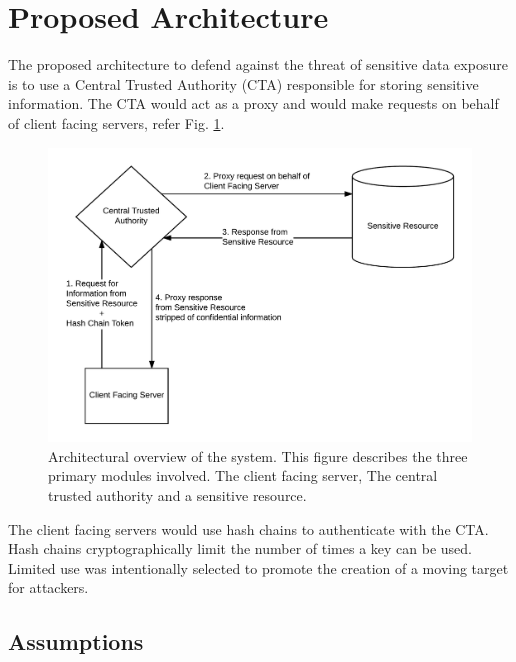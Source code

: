 \documentclass{sig-alternate-05-2015}
\begin{document}
\section{Proposed Architecture}

The proposed architecture to defend against the threat of sensitive data exposure is to use a Central Trusted Authority (CTA) responsible for storing sensitive information. The CTA would act as a proxy and would make requests on behalf of client facing servers, refer Fig. \ref{fig:architectureoverview}.

\begin{figure}[ht]
\includegraphics[keepaspectratio=true,scale=0.145]{overview_architecture.png}
\caption{Architectural overview of the system. This figure describes the three primary modules involved. The client facing server, The central trusted authority and a sensitive resource.}
\label{fig:architectureoverview} 
\end{figure}

The client facing servers would use hash chains to authenticate with the CTA. Hash chains cryptographically limit the number of times a key can be used. Limited use was intentionally selected to promote the creation of a moving target for attackers.

\subsection{Assumptions}
\end{document}
